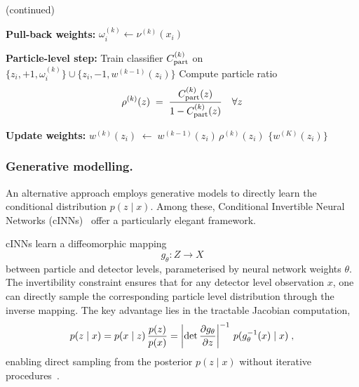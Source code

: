 \begin{algorithm}\ContinuedFloat
  \caption[]{(continued)} %
  \begin{algorithmic}[1]
    
    \State \textbf{Pull-back weights:}
      \State $\omega_i^{(k)} \leftarrow \nu^{(k)}(x_i)$
    \EndFor
    
    \State \textbf{Particle-level step:}
    \State Train classifier $C_{\rm part}^{(k)}$ on
      $\{z_i,+1,\omega_i^{(k)}\}\cup\{z_i,-1,w^{(k-1)}(z_i)\}$
    \State Compute particle ratio
      \[
        \rho^{(k)}(z)\;=\;\frac{C_{\rm part}^{(k)}(z)}{1 - C_{\rm part}^{(k)}(z)}
        \quad\forall z
      \]
    
    \State \textbf{Update weights:}
      \State $w^{(k)}(z_i)\;\leftarrow\;w^{(k-1)}(z_i)\,\rho^{(k)}(z_i)$
    \EndFor
  \EndFor
  \State \Return $\{w^{(K)}(z_i)\}$
  \end{algorithmic}
\end{algorithm}
        \subsubsection{Generative modelling.}
            An alternative approach employs generative models to directly learn the conditional distribution \(p(z \mid x)\).
            Among these, Conditional Invertible Neural Networks (cINNs)~\cite{AnanthaPadmanabha2021SolvingNetworks} offer a particularly elegant framework.
            
            cINNs learn a diffeomorphic mapping \[g_\theta: {Z} \to {X}\] between particle and detector levels, parameterised by neural network weights \(\theta\).
            The invertibility constraint ensures that for any detector level observation \(x\), one can directly sample the corresponding particle level distribution through the inverse mapping.
            The key advantage lies in the tractable Jacobian computation,
            \begin{equation}
                p(z\mid x) = p(x\mid z) \,\frac{p(z)}{p(x)} = \left|\det \pdv{g_\theta}{z} \right|^{-1}\, p(g_\theta^{-1}(x) \mid x)\;,
            \end{equation}
            enabling direct sampling from the posterior \(p(z \mid x)\) without iterative procedures~\cite{Bellagente2020InvertibleAgain}.

